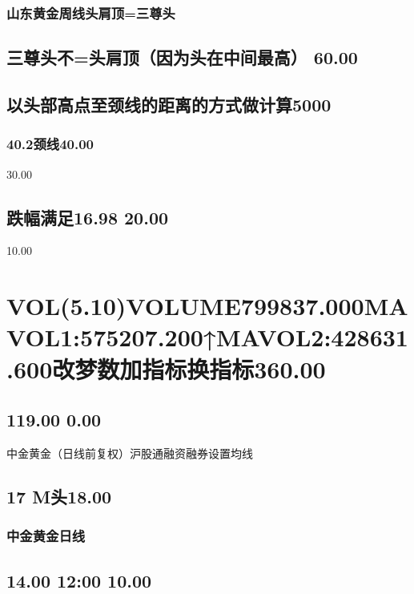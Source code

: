 \documentclass{article}
\begin{document}
\subsubsection{山东黄金周线头肩顶=三尊头}

\subsection{三尊头不=头肩顶（因为头在中间最高） 60.00}

\subsection{以头部高点至颈线的距离的方式做计算5000}

\subsubsection{40.2颈线40.00}

30.00

\subsection{跌幅满足16.98 20.00}

10.00

\section{VOL(5.10)VOLUME799837.000MAVOL1:575207.200↑MAVOL2:428631.600改梦数加指标换指标360.00}

\subsection{119.00 0.00}

中金黄金（日线前复权）沪股通融资融券设置均线

\subsection{17 M头18.00}

\subsubsection{中金黄金日线}

\subsection{14.00 12:00 10.00}
\end{document}
